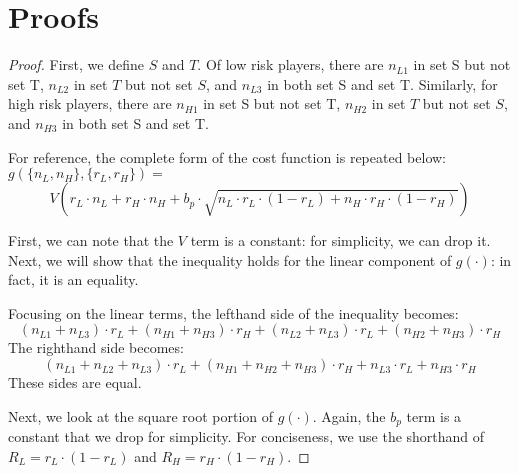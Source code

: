 \documentclass[sigconf]{acmart}
\newcommand{\p}[1]{\left( #1 \right)}
\newcommand{\nL}[0]{\ensuremath{n_L}}
\newcommand{\nH}[0]{\ensuremath{n_H}}
\newcommand{\nLv}[1]{\ensuremath{n_{L#1}}}
\newcommand{\nHv}[1]{\ensuremath{n_{H#1}}}
\newcommand{\rL}[0]{\ensuremath{r_L}}
\newcommand{\rH}[0]{\ensuremath{r_H}}
\newcommand{\RL}[0]{\ensuremath{R_L}}
\newcommand{\RH}[0]{\ensuremath{R_H}}
\newcommand{\V}[0]{\ensuremath{V}}
\newcommand{\bp}[0]{\ensuremath{b_p}}
\newcommand{\cost}[0]{\ensuremath{g}}
\newcommand{\cd}[0]{\cdot}
\begin{document}
\section{Proofs}\label{App:proofs}
\submod*
\begin{proof}
First, we define $S$ and $T$. Of low risk players, there are $\nLv{1}$ in set S but not set T, $\nLv{2}$ in set $T$ but not set $S$, and $\nLv{3}$ in both set S and set T. Similarly, for high risk players, there are $\nHv{1}$ in set S but not set T, $\nHv{2}$ in set $T$ but not set $S$, and $\nHv{3}$ in both set S and set T. 

For reference, the complete form of the cost function is repeated below: $\cost(\{\nL, \nH\}, \{\rL, \rH\}) = $
$$\V \p{\rL \cd \nL + \rH \cd \nH + \bp \cd \sqrt{\nL \cdot \rL \cd (1-\rL) + \nH \cd \rH \cd (1-\rH)}}$$

First, we can note that the $\V$ term is a constant: for simplicity, we can drop it. Next, we will show that the inequality holds for the linear component of $\cost(\cdot)$: in fact, it is an equality.

Focusing on the linear terms, the lefthand side of the inequality becomes: 
$$(\nLv{1} + \nLv{3}) \cd \rL + (\nHv{1} + \nHv{3}) \cd \rH  + (\nLv{2} + \nLv{3}) \cd \rL+ (\nHv{2} + \nHv{3}) \cd \rH $$
The righthand side becomes: 
$$(\nLv{1} + \nLv{2} + \nLv{3}) \cd \rL + (\nHv{1} + \nHv{2} + \nHv{3})\cd \rH + \nLv{3} \cd \rL + \nHv{3} \cd \rH$$
These sides are equal. 

Next, we look at the square root portion of $\cost(\cd)$. Again, the $\bp$ term is a constant that we drop for simplicity. For conciseness, we use the shorthand of $\RL = \rL \cd (1-\rL)$ and $\RH = \rH\cd (1-\rH)$. 


\end{proof}
\end{document}
